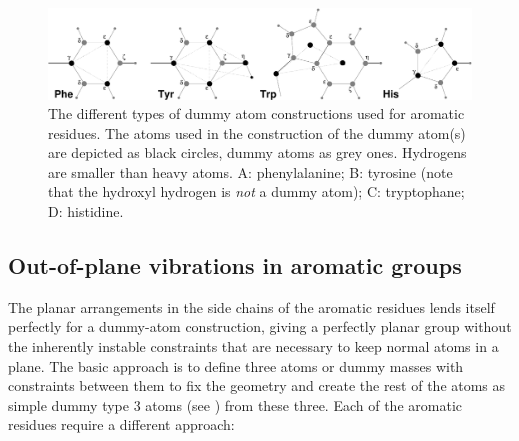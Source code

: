 \begin{figure}
\centerline{\includegraphics[width=15cm]{plots/dumaro}}
\caption[Dummy atom constructions for aromatic residues.]{The
different types of dummy atom constructions used for aromatic
residues. The atoms used in the construction of the dummy atom(s) are
depicted as black circles, dummy atoms as grey ones. Hydrogens are
smaller than heavy atoms. {\sf A}: phenylalanine; {\sf B}: tyrosine
(note that the hydroxyl hydrogen is {\em not} a dummy atom); {\sf C}:
tryptophane; {\sf D}: histidine.}
\label{fig:dumaro}
\end{figure}

\subsection{Out-of-plane vibrations in aromatic groups}
\label{sec:dummyaro}
The planar arrangements in the side chains of the aromatic residues
lends itself perfectly for a dummy-atom construction, giving a
perfectly planar group without the inherently instable constraints
that are necessary to keep normal atoms in a plane. The basic approach
is to define three atoms or dummy masses with constraints between them
to fix the geometry and create the rest of the atoms as simple dummy
type 3 atoms (see ) from these three. Each of
the aromatic residues require a different approach:

